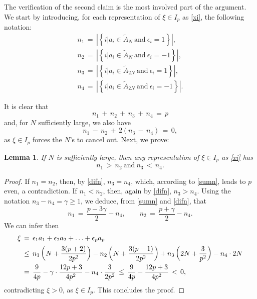 \documentclass{amsart}
\newtheorem{lemma}[theorem]{Lemma}
\begin{document}
The verification of the second claim is the most involved part of the argument. We start by introducing, for each representation of $\xi\in I_p$ as \eqref{xi}, the following notation:
\begin{align}
n_1\,=\,\left|\left\{ i| a_i\in  \tilde{A}_N \ \text{and} \ \epsilon_i = 1\right\}\right|,\label{n1}\\
n_2\,=\,\left|\left\{ i| a_i\in  \tilde{A}_N \ \text{and} \ \epsilon_i = -1\right\}\right|,\label{n2}\\
n_3\,=\,\left|\left\{ i| a_i\in  \tilde{A}_{2N} \ \text{and} \ \epsilon_i = 1\right\}\right|,\label{n3}\\
n_4\,=\,\left|\left\{ i| a_i\in  \tilde{A}_{2N} \ \text{and} \ \epsilon_i = -1\right\}\right|. \label{n4}
\end{align} 

It is clear that 
\begin{equation}
n_1\,+\,n_2\,+\,n_3\,+\,n_4\,=\,p
\label{sumn}
\end{equation}
and, for $N$ sufficiently large, we also have
\begin{equation}
n_1\,-\,n_2\,+\,2(n_3\,-\,n_4)\,=\,0,
\label{difn}
\end{equation}
as $\xi\in I_p$ forces the $N$'s to cancel out. Next, we prove:

\begin{lemma}
If $N$ is sufficiently large, then any representation of $\xi\in I_p$ as \eqref{xi} has
\begin{equation}
n_1\,>\,n_2  \ \text{and} \ n_3\,<\,n_4.
\end{equation}
\end{lemma}

\begin{proof}
If $n_1=n_2$, then, by \eqref{difn}, $n_3=n_4$, which, according to \eqref{sumn}, leads to $p$ even, a contradiction. If $n_1<n_2$, then, again by \eqref{difn}, $n_3>n_4$. Using the notation $n_3-n_4=\gamma\geq 1$, we deduce, from \eqref{sumn} and \eqref{difn}, that
\begin{equation}
n_1\,=\,\frac{p-3\gamma}{2} - n_4, \qquad n_2\,=\,\frac{p+\gamma}{2} - n_4.
\label{n1n2}
\end{equation}
We can infer then
\[
\aligned
\xi\,&=\,  \epsilon_1 a_1+\epsilon_2 a_2+ \ldots+\epsilon_p a_p\\ 
&\leq\, n_1\left(N+ \frac{3(p+2)}{2p^2}\right) - n_2 \left(N+\frac{3(p-1)}{2p^2}\right) + n_3\left(2N +\frac{3}{p^2}\right) - n_4\cdot 2N\\
&=\,\frac{9}{4p} - \gamma \cdot \frac{12p+3}{4p^2} - n_4\cdot \frac{3}{2p^2}\,\leq\,\frac{9}{4p} - \frac{12p+3}{4p^2}\,<\,0,\endaligned
\]
contradicting $\xi>0$, as $\xi\in I_p$. This concludes the proof.
\end{proof}
\end{document}
